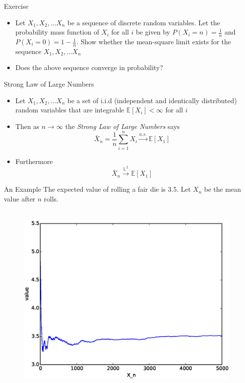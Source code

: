 \documentclass{beamer}
\begin{document}
\begin{frame}{Exercise} 
\begin{itemize} 
\item Let $X_1, X_2, \ldots X_n$  be a sequence of discrete random variables. Let the probability mass function of $X_i$ for all $i$ be given by $P(X_i = n) = \frac{1}{n}$ and $P(X_i = 0) = 1-\frac{1}{n}$. Show whether the mean-square limit exists for the sequence $X_1, X_2, \ldots X_n$
\item Does the above sequence converge in probability? 
\end{itemize}
\end{frame}

\begin{frame}{Strong Law of Large Numbers} 
\begin{itemize}
 \item Let $X_1, X_2, \ldots X_n$ be a set of i.i.d (independent and identically distributed) random variables that are integrable $\mathbb{E}[X_i] < \infty$ for all $i$
 \item Then as $n \rightarrow \infty$ the \emph{Strong Law of Large Numbers} says
 \begin{displaymath} 
  \bar{X}_n = \frac{1}{n}\sum_{i=1}^n X_i \xrightarrow{a.s.} \mathbb{E}[X_1]
 \end{displaymath}
\item Furthermore 
\begin{displaymath} 
 \bar{X}_n \xrightarrow{\mathbb{L}^2} \mathbb{E}[X_1]
\end{displaymath}
\end{itemize}
\end{frame}

\begin{frame}{An Example}
The expected value of rolling a fair die is 3.5. Let $X_n$ be the mean value after $n$ rolls. 
\begin{figure}[htp]
\mbox{
\includegraphics[width=0.5\linewidth]{LawLargeNumbers.eps}
}
\end{figure} 
\end{frame}
\end{document}

